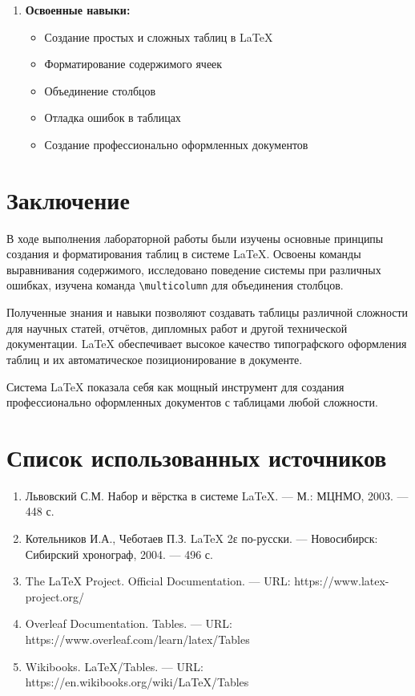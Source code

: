 \documentclass[12pt,a4paper]{article}
\begin{document}
\begin{enumerate}
    \item \textbf{Освоенные навыки:}
    \begin{itemize}
        \item Создание простых и сложных таблиц в LaTeX
        \item Форматирование содержимого ячеек
        \item Объединение столбцов
        \item Отладка ошибок в таблицах
        \item Создание профессионально оформленных документов
    \end{itemize}
\end{enumerate}

\section{Заключение}

В ходе выполнения лабораторной работы были изучены основные принципы создания и форматирования таблиц в системе LaTeX. Освоены команды выравнивания содержимого, исследовано поведение системы при различных ошибках, изучена команда \texttt{\textbackslash multicolumn} для объединения столбцов.

Полученные знания и навыки позволяют создавать таблицы различной сложности для научных статей, отчётов, дипломных работ и другой технической документации. LaTeX обеспечивает высокое качество типографского оформления таблиц и их автоматическое позиционирование в документе.

Система LaTeX показала себя как мощный инструмент для создания профессионально оформленных документов с таблицами любой сложности.

\section{Список использованных источников}

\begin{enumerate}
    \item Львовский С.М. Набор и вёрстка в системе LaTeX. — М.: МЦНМО, 2003. — 448 с.
    \item Котельников И.А., Чеботаев П.З. LaTeX 2ε по-русски. — Новосибирск: Сибирский хронограф, 2004. — 496 с.
    \item The LaTeX Project. Official Documentation. — URL: https://www.latex-project.org/
    \item Overleaf Documentation. Tables. — URL: https://www.overleaf.com/learn/latex/Tables
    \item Wikibooks. LaTeX/Tables. — URL: https://en.wikibooks.org/wiki/LaTeX/Tables
\end{enumerate}
\end{document}
